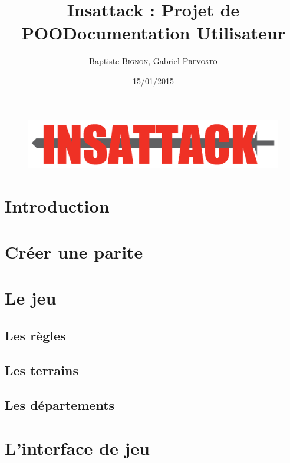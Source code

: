 \documentclass[12pt]{article}
\title{Insattack : Projet de POO\smallbreak Documentation Utilisateur}
\author{Baptiste \textsc{Bignon}, Gabriel \textsc{Prevosto}}
\date{15/01/2015}
\begin{document}
\maketitle
\vfill %

\begin{figure}[!h]
\centering
\includegraphics[width=\textwidth]{Parties/Images/Logo}
\label{fig:logo}
\end{figure}

\vfill
\vfill
\newpage

\section{Introduction}				\label{sec:introduction}			

\tableofcontents
\renewcommand{\contentsname}{Sommaire}
\newpage

\section{Créer une parite}			\label{sec:creation_partie}			
\clearpage

\section{Le jeu}					\label{sec:jeu}
\subsection{Les règles}				\label{sec:regles}					
\clearpage
\subsection{Les terrains}			\label{sec:terrains}				
\clearpage
\subsection{Les départements}			\label{sec:departements}			
\clearpage

\section{L'interface de jeu}		\label{sec:sauvegarde_chargement}	
\end{document}
